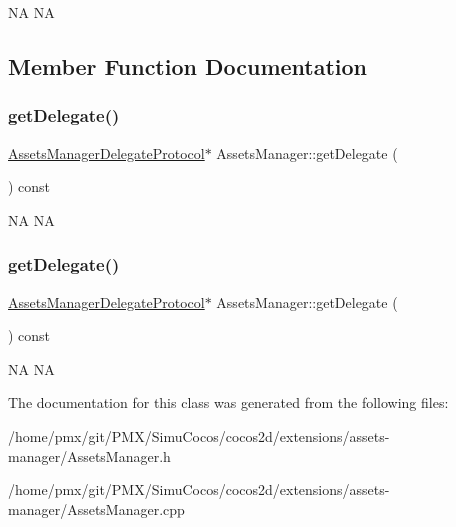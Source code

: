 NA  NA 

\subsection{Member Function Documentation}
\mbox{\label{classAssetsManager_a297c23ec228e1885904f9ab9864a4d65}} 
\subsubsection{\texorpdfstring{get\+Delegate()}{getDelegate()}\hspace{0.1cm}{\footnotesize\ttfamily [1/2]}}
{\footnotesize\ttfamily \hyperlink{classAssetsManagerDelegateProtocol}{Assets\+Manager\+Delegate\+Protocol}$\ast$ Assets\+Manager\+::get\+Delegate (\begin{DoxyParamCaption}{ }\end{DoxyParamCaption}) const\hspace{0.3cm}{\ttfamily [inline]}}

NA  NA \mbox{\label{classAssetsManager_a297c23ec228e1885904f9ab9864a4d65}} 
\subsubsection{\texorpdfstring{get\+Delegate()}{getDelegate()}\hspace{0.1cm}{\footnotesize\ttfamily [2/2]}}
{\footnotesize\ttfamily \hyperlink{classAssetsManagerDelegateProtocol}{Assets\+Manager\+Delegate\+Protocol}$\ast$ Assets\+Manager\+::get\+Delegate (\begin{DoxyParamCaption}{ }\end{DoxyParamCaption}) const\hspace{0.3cm}{\ttfamily [inline]}}

NA  NA 

The documentation for this class was generated from the following files\+:\begin{DoxyCompactItemize}
\item 
/home/pmx/git/\+P\+M\+X/\+Simu\+Cocos/cocos2d/extensions/assets-\/manager/Assets\+Manager.\+h\item 
/home/pmx/git/\+P\+M\+X/\+Simu\+Cocos/cocos2d/extensions/assets-\/manager/Assets\+Manager.\+cpp\end{DoxyCompactItemize}
